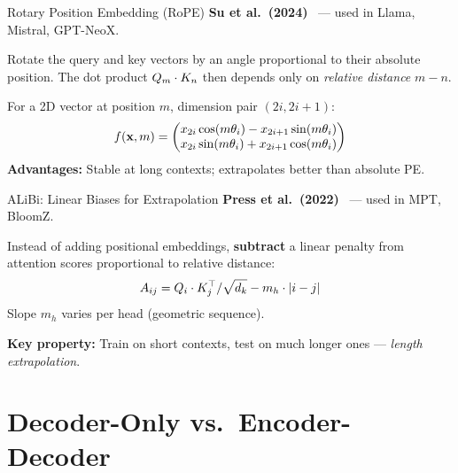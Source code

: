 \documentclass[aspectratio=169,10pt]{beamer}
\begin{document}
\begin{frame}{Rotary Position Embedding (RoPE)}
  \textbf{Su et al.\ (2024)}~\cite{su2024roformer} — used in Llama, Mistral, GPT-NeoX.
  \vspace{0.4em}
  \begin{tcolorbox}[hitbox, title=Core Idea]
    Rotate the query and key vectors by an angle proportional to their absolute position.
    The dot product $Q_m \cdot K_n$ then depends only on \emph{relative distance} $m - n$.
  \end{tcolorbox}
  \vspace{0.4em}
  For a 2D vector at position $m$, dimension pair $(2i, 2i{+}1)$:
  \[
    f(\mathbf{x}, m) = \begin{pmatrix} x_{2i}\cos(m\theta_i) - x_{2i+1}\sin(m\theta_i)\\
                                      x_{2i}\sin(m\theta_i) + x_{2i+1}\cos(m\theta_i) \end{pmatrix}
  \]
  \textbf{Advantages:} Stable at long contexts; extrapolates better than absolute PE.
\end{frame}

\begin{frame}{ALiBi: Linear Biases for Extrapolation}
  \textbf{Press et al.\ (2022)}~\cite{press2022alibi} — used in MPT, BloomZ.
  \vspace{0.4em}
  \begin{tcolorbox}[hitbox, title=ALiBi Mechanism]
    Instead of adding positional embeddings, \textbf{subtract} a linear penalty from attention
    scores proportional to relative distance:
    \[
      A_{ij} = Q_i \cdot K_j^{\top} / \sqrt{d_k} - m_h \cdot |i - j|
    \]
    Slope $m_h$ varies per head (geometric sequence).
  \end{tcolorbox}
  \vspace{0.3em}
  \textbf{Key property:} Train on short contexts, test on much longer ones — \emph{length extrapolation}.
\end{frame}

\section{Decoder-Only vs.\ Encoder-Decoder}
\end{document}
